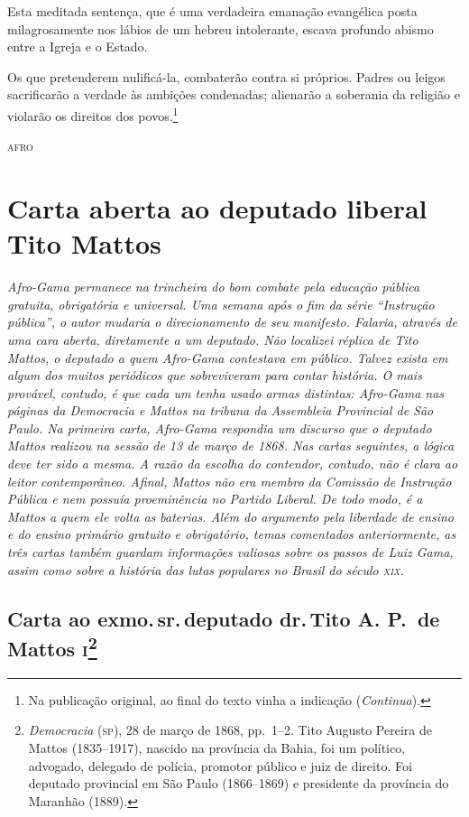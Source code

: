 Esta meditada sentença, que é uma verdadeira emanação evangélica posta
milagrosamente nos lábios de um hebreu intolerante, escava profundo
abismo entre a Igreja e o Estado.

Os que pretenderem nulificá-la, combaterão contra si próprios. Padres ou
leigos sacrificarão a verdade às ambições condenadas; alienarão a
soberania da religião e violarão os direitos dos povos.\footnote{Na publicação original, ao final do texto vinha a indicação (\emph{Continua}).}

\begin{flushright}
\textsc{afro}
\end{flushright}

\part{Carta aberta ao deputado liberal Tito Mattos}

\begin{argumento}\itshape
Afro-Gama permanece na trincheira do bom combate pela educação
pública gratuita, obrigatória e universal. Uma semana após o fim da
série ``Instrução pública'', o autor mudaria o direcionamento de
seu manifesto. Falaria, através de uma cara aberta, diretamente a um
deputado. Não localizei réplica de Tito Mattos, o deputado a quem
Afro-Gama contestava em público. Talvez exista em algum dos muitos
periódicos que sobreviveram para contar história. O mais provável,
contudo, é que cada um tenha usado armas distintas: Afro-Gama nas
páginas da \textnormal{Democracia} e Mattos na tribuna da Assembleia
Provincial de São Paulo. Na primeira carta, Afro-Gama respondia
um discurso que o deputado Mattos realizou na sessão de 13 de março de 1868. Nas
cartas seguintes, a lógica deve ter sido a mesma. A razão da escolha do
contendor, contudo, não é clara ao leitor contemporâneo. Afinal, Mattos
não era membro da Comissão de Instrução Pública e nem possuía
proeminência no Partido Liberal. De todo modo, é a Mattos a quem ele
volta as baterias. Além do argumento pela liberdade de ensino e do
ensino primário gratuito e obrigatório, temas comentados anteriormente,
as três cartas também guardam informações valiosas sobre os passos de
Luiz Gama, assim como sobre a história das lutas populares no Brasil do
século \textsc{xix}.
\end{argumento}

\chapter{Carta ao exmo.\,sr.\,deputado dr.\,Tito A. P.~de Mattos
\textsc{i}\footnote{\emph{Democracia} (\textsc{sp}), 28 de março de 1868, pp.~1--2. Tito
  Augusto Pereira de Mattos (1835--1917), nascido na província da Bahia,\label{tito}
  foi um político, advogado, delegado de polícia, promotor público e
  juiz de direito. Foi deputado provincial em São Paulo (1866--1869) e presidente da província do Maranhão (1889).}}

